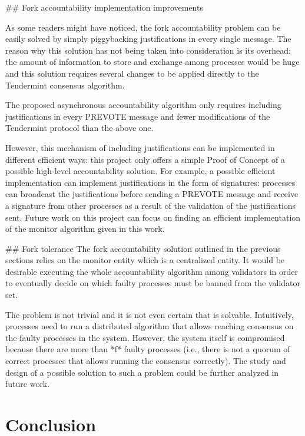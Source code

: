 \documentclass[a4paper,11pt,oneside]{report}
\begin{document}
\begin{markdown}
## Fork accountability implementation improvements

As some readers might have noticed, the fork accountability problem can be easily solved by simply piggybacking justifications in every single message.
The reason why this solution has not being taken into consideration is its overhead: the amount of information to store and exchange among processes would be huge and this solution requires several changes to be applied directly to the Tendermint consensus algorithm. 

The proposed asynchronous accountability algorithm only requires including justifications in every PREVOTE message and fewer modifications of the Tendermint protocol than the above one.

However, this mechanism of including justifications can be implemented in different efficient ways: this project only offers a simple Proof of Concept of a possible high-level accountability solution.
For example, a possible efficient implementation can implement justifications in the form of signatures: processes can broadcast the justifications before sending a PREVOTE message and receive a signature from other processes as a result of the validation of the justifications sent. Future work on this project can focus on finding an efficient implementation of the monitor algorithm given in this work.  


## Fork tolerance
The fork accountability solution outlined in the previous sections relies on the monitor entity which is a centralized entity. It would be desirable executing the whole accountability algorithm among validators in order to eventually decide on which faulty processes must be banned from the validator set.

The problem is not trivial and it is not even certain that is solvable. 
Intuitively, processes need to run a distributed algorithm that allows reaching consensus on the faulty processes in the system.
However, the system itself is compromised because there are more than *f* faulty processes (i.e., there is not a quorum of correct processes that allows running the consensus correctly). The study and  design of a possible solution to such a problem could be further analyzed in future work.


\end{markdown}


\chapter{Conclusion}
\end{document}
